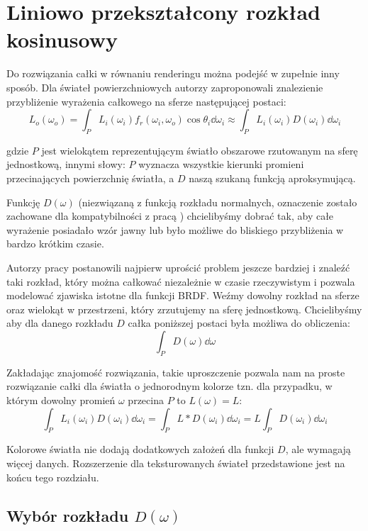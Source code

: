 \documentclass[../main.tex]{subfiles}
\begin{document}
\chapter{Liniowo przekształcony rozkład kosinusowy}
\label{Chapter:LTC}

Do rozwiązania całki w równaniu renderingu można podejść w zupełnie inny sposób. Dla świateł powierzchniowych autorzy \cite{ltc_heitz} zaproponowali znalezienie przybliżenie wyrażenia całkowego na sferze następującej postaci:
\[
L_o(\omega_o) = \int_{P} {
  L_i(\omega_i)
  f_r(\omega_i, \omega_o)
  \cos \theta_i
  \dd \omega_i
}
\approx
\int_{P} {
  L_i(\omega_i)
  D(\omega_i)
  \dd \omega_i
}
\]

\noindent gdzie $P$ jest wielokątem reprezentującym światło obszarowe rzutowanym na sferę jednostkową, innymi słowy: $P$ wyznacza wszystkie kierunki promieni przecinających powierzchnię światła, a $D$ naszą szukaną funkcją aproksymującą.

Funkcję $D(\omega)$ (niezwiązaną z funkcją rozkładu normalnych, oznaczenie zostało zachowane dla kompatybilności z pracą \cite{ltc_heitz}) chcielibyśmy dobrać tak, aby całe wyrażenie posiadało wzór jawny lub było możliwe do bliskiego przybliżenia w bardzo krótkim czasie.

Autorzy pracy \cite{ltc_heitz} postanowili najpierw uprościć problem jeszcze bardziej i znaleźć taki rozkład, który można całkować niezależnie w czasie rzeczywistym i pozwala modelować  zjawiska istotne dla funkcji BRDF. Weźmy dowolny rozkład na sferze oraz wielokąt  w przestrzeni, który zrzutujemy na sferę jednostkową. Chcielibyśmy aby dla danego rozkładu $D$ całka poniższej postaci była możliwa do obliczenia:
\[
\int_P {
    D(\omega)
    \dd \omega
}
\]

Zakładając znajomość rozwiązania, takie uproszczenie pozwala nam na proste rozwiązanie całki dla światła o jednorodnym kolorze tzn. dla przypadku, w którym dowolny promień $\omega$ przecina $P$ to $L(\omega)=L$:
\[
\int_{P} {
    L_i(\omega_i)
    D(\omega_i)
    \dd \omega_i
} = \int_{P} {
    L *
    D(\omega_i)
    \dd \omega_i
} = L \int_{P} {
    D(\omega_i)
    \dd \omega_i
}
\]

Kolorowe światła nie dodają dodatkowych założeń dla funkcji $D$, ale wymagają więcej danych. Rozszerzenie dla teksturowanych świateł przedstawione jest na końcu tego rozdziału.

\section{Wybór rozkładu $D(\omega)$}
\end{document}
